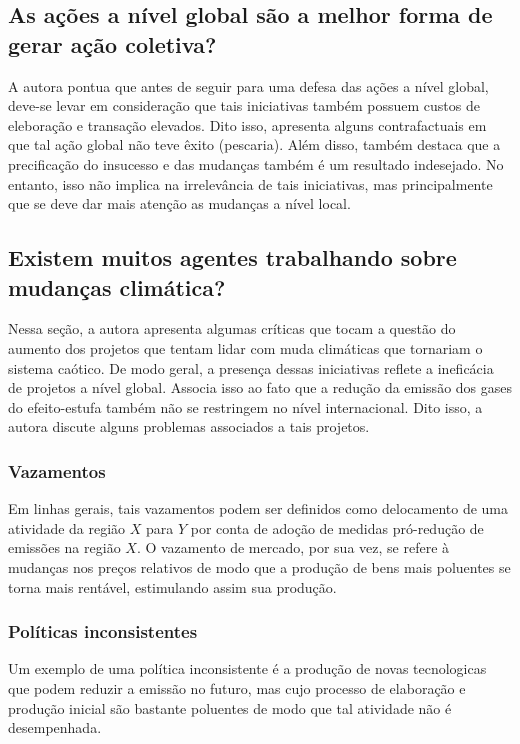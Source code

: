 \documentclass[11pt]{article}
\begin{document}
\subsection{As ações a nível global são a melhor forma de gerar ação coletiva?}
\label{sec:orga088201}

A autora pontua que antes de seguir para uma defesa das ações a nível global, deve-se levar em consideração que tais iniciativas também possuem custos de eleboração e transação elevados.
Dito isso, apresenta alguns contrafactuais em que tal ação global não teve êxito (pescaria).
Além disso, também destaca que a precificação do insucesso e das mudanças também é um resultado indesejado.
No entanto, isso não implica na irrelevância de tais iniciativas, mas principalmente que se deve dar mais atenção as mudanças a nível local.

\subsection{Existem muitos agentes trabalhando sobre mudanças climática?}
\label{sec:org3f39d2e}

Nessa seção, a autora apresenta algumas críticas que tocam a questão do aumento dos projetos que tentam lidar com muda climáticas que tornariam o sistema caótico.
De modo geral, a presença dessas iniciativas reflete a ineficácia de projetos a nível global.
Associa isso ao fato que a redução da emissão dos gases do efeito-estufa também não se restringem no nível internacional.
Dito isso, a autora discute alguns problemas associados a tais projetos.

\subsubsection{Vazamentos}
\label{sec:org227760e}
Em linhas gerais, tais vazamentos podem ser definidos como delocamento de uma atividade da região \(X\) para \(Y\) por conta de adoção de medidas pró-redução de emissões na região \(X\).
O vazamento de mercado, por sua vez, se refere à mudanças nos preços relativos de modo que a produção de bens mais poluentes se torna mais rentável, estimulando assim sua produção.

\subsubsection{Políticas inconsistentes}
\label{sec:org0b22cd0}
Um exemplo de uma política inconsistente é a produção de novas tecnologicas que podem reduzir a emissão no futuro, mas cujo processo de elaboração e produção inicial são bastante poluentes de modo que tal atividade não é desempenhada.
\end{document}
